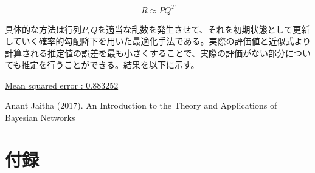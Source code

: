 \documentclass[a4paper,12pt]{jarticle}
\begin{document}
$$ R \approx P  Q^T$$

具体的な方法は行列$P,Q$を適当な乱数を発生させて、それを初期状態として更新していく確率的勾配降下を用いた最適化手法である。実際の評価値と近似式より計算される推定値の誤差を最も小さくすることで、実際の評価がない部分についても推定を行うことができる。結果を以下に示す。

\underline{Mean squared error :  0.883252}

\begin{thebibliography}{5}
\bibitem{}  Anant Jaitha (2017). An Introduction to the Theory and Applications of Bayesian Networks 
\end{thebibliography}

\newpage
\section{付録}
\end{document}
